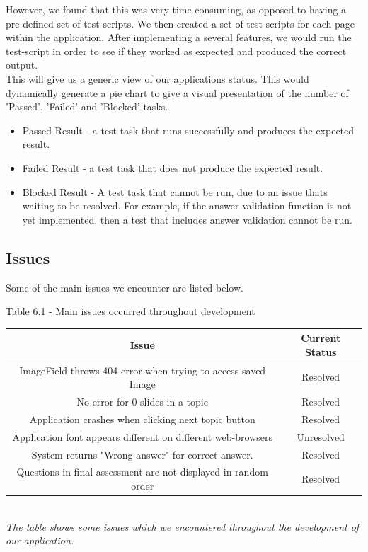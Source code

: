 \documentclass{l3proj}
\begin{document}
{However, we found that this was very time consuming, as opposed to having a pre-defined set of test scripts. We then created a set of test scripts for each page within the application. After implementing a several features, we would run the test-script in order to see if they worked as expected and produced the correct output.\\
This will give us a generic view of our applications status. This would dynamically generate a pie chart to give a visual presentation of the number of 'Passed', 'Failed' and 'Blocked' tasks.

\begin{itemize}
\item Passed Result - a test task that runs successfully and produces the expected result.
\item Failed Result - a test task that does not produce the expected result.
\item Blocked Result - A test task that cannot be run, due to an issue thats waiting to be resolved. For example, if the answer validation function is not yet implemented, then a test that includes answer validation cannot be run.
\end{itemize}

\subsection{Issues}

Some of the main issues we encounter are listed below.

\begin{center}
Table 6.1 - Main issues occurred throughout development\\
\begin{tabular}{|c|c|}
\hline \textbf{Issue} & \textbf{Current Status}\\
\hline 
\hline ImageField throws 404 error when trying to access saved Image & Resolved\\
\hline No error for 0 slides in a topic & Resolved\\
\hline Application crashes when clicking next topic button & Resolved\\
\hline Application font appears different on different web-browsers & Unresolved\\
\hline System returns "Wrong answer" for correct answer. & Resolved\\
\hline Questions in final assessment are not displayed in random order & Resolved\\
\hline
\end{tabular}\\
\textit{{\small The table shows some issues which we encountered throughout the development of our application.}}
\end{center}


}
\end{document}
